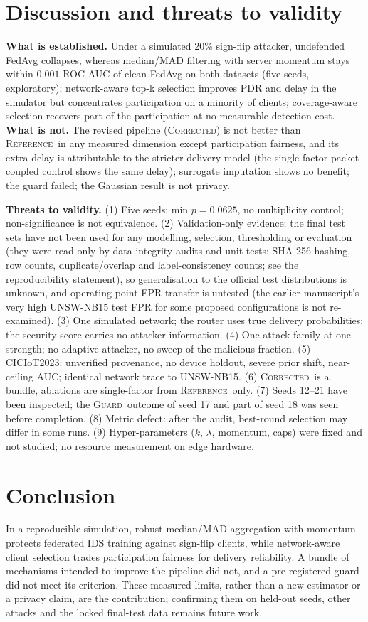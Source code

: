 \documentclass[preprint,12pt,times,numafflabel]{elsarticle}
\newcommand{\RefA}{\textsc{Reference}}
\newcommand{\Cor}{\textsc{Corrected}}
\newcommand{\Guard}{\textsc{Guard}}
\begin{document}
\section{Discussion and threats to validity}
\textbf{What is established.} Under a simulated 20\% sign-flip attacker, undefended FedAvg collapses, whereas median/MAD filtering with server momentum stays within $0.001$ ROC-AUC of clean FedAvg on both datasets (five seeds, exploratory); network-aware top-k selection improves PDR and delay in the simulator but concentrates participation on a minority of clients; coverage-aware selection recovers part of the participation at no measurable detection cost. \textbf{What is not.} The revised pipeline (\Cor) is not better than \RefA\ in any measured dimension except participation fairness, and its extra delay is attributable to the stricter delivery model (the single-factor packet-coupled control shows the same delay); surrogate imputation shows no benefit; the guard failed; the Gaussian result is not privacy.

\textbf{Threats to validity.} (1) Five seeds: min $p=0.0625$, no multiplicity control; non-significance is not equivalence. (2) Validation-only evidence; the final test sets have not been used for any modelling, selection, thresholding or evaluation (they were read only by data-integrity audits and unit tests: SHA-256 hashing, row counts, duplicate/overlap and label-consistency counts; see the reproducibility statement), so generalisation to the official test distributions is unknown, and operating-point FPR transfer is untested (the earlier manuscript's very high UNSW-NB15 test FPR for some proposed configurations is not re-examined). (3) One simulated network; the router uses true delivery probabilities; the security score carries no attacker information. (4) One attack family at one strength; no adaptive attacker, no sweep of the malicious fraction. (5) CICIoT2023: unverified provenance, no device holdout, severe prior shift, near-ceiling AUC; identical network trace to UNSW-NB15. (6) \Cor\ is a bundle, ablations are single-factor from \RefA\ only. (7) Seeds 12--21 have been inspected; the \Guard\ outcome of seed 17 and part of seed 18 was seen before completion. (8) Metric defect: after the audit, best-round selection may differ in some runs. (9) Hyper-parameters ($k$, $\lambda$, momentum, caps) were fixed and not studied; no resource measurement on edge hardware.

\section{Conclusion}
In a reproducible simulation, robust median/MAD aggregation with momentum protects federated IDS training against sign-flip clients, while network-aware client selection trades participation fairness for delivery reliability. A bundle of mechanisms intended to improve the pipeline did not, and a pre-registered guard did not meet its criterion. These measured limits, rather than a new estimator or a privacy claim, are the contribution; confirming them on held-out seeds, other attacks and the locked final-test data remains future work.
\end{document}
